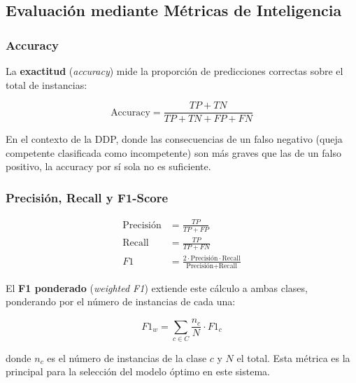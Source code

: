 \subsection{Evaluación mediante Métricas de Inteligencia}

\subsubsection*{Accuracy}

La \textbf{exactitud} (\textit{accuracy}) mide la proporción de predicciones
correctas sobre el total de instancias:

\begin{equation}
  \text{Accuracy} = \frac{TP + TN}{TP + TN + FP + FN}
  \label{eq:accuracy}
\end{equation}

En el contexto de la DDP, donde las consecuencias de un falso negativo (queja
competente clasificada como incompetente) son más graves que las de un falso
positivo, la accuracy por sí sola no es suficiente.

\subsubsection*{Precisión, Recall y F1-Score}

\begin{align}
  \text{Precisión} &= \frac{TP}{TP + FP}
  \label{eq:precision}\\[6pt]
  \text{Recall} &= \frac{TP}{TP + FN}
  \label{eq:recall}\\[6pt]
  F1 &= \frac{2 \cdot \text{Precisión} \cdot \text{Recall}}
             {\text{Precisión} + \text{Recall}}
  \label{eq:f1}
\end{align}

El \textbf{F1 ponderado} (\textit{weighted F1}) extiende este cálculo a ambas
clases, ponderando por el número de instancias de cada una:

\begin{equation}
  F1_w = \sum_{c \in C} \frac{n_c}{N} \cdot F1_c
  \label{eq:f1w}
\end{equation}

donde $n_c$ es el número de instancias de la clase $c$ y $N$ el total. Esta
métrica es la principal para la selección del modelo óptimo en este sistema.

